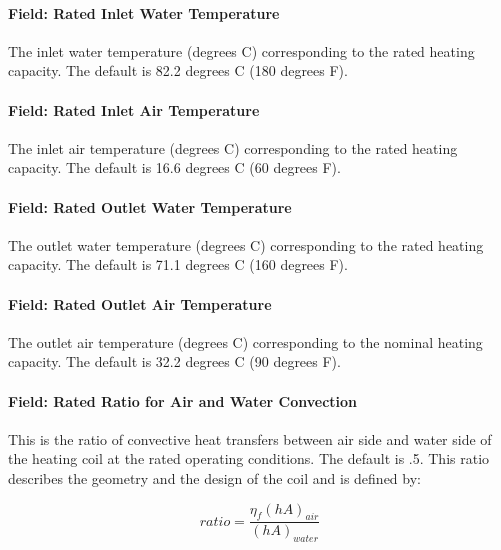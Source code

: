 \paragraph{Field: Rated Inlet Water Temperature}\label{field-rated-inlet-water-temperature}

The inlet water temperature (degrees C) corresponding to the rated heating capacity. The default is 82.2 degrees C (180 degrees F).

\paragraph{Field: Rated Inlet Air Temperature}\label{field-rated-inlet-air-temperature}

The inlet air temperature (degrees C) corresponding to the rated heating capacity. The default is 16.6 degrees C (60 degrees F).

\paragraph{Field: Rated Outlet Water Temperature}\label{field-rated-outlet-water-temperature}

The outlet water temperature (degrees C) corresponding to the rated heating capacity. The default is 71.1 degrees C (160 degrees F).

\paragraph{Field: Rated Outlet Air Temperature}\label{field-rated-outlet-air-temperature}

The outlet air temperature (degrees C) corresponding to the nominal heating capacity. The default is 32.2 degrees C (90 degrees F).

\paragraph{Field: Rated Ratio for Air and Water Convection}\label{field-rated-ratio-for-air-and-water-convection}

This is the ratio of convective heat transfers between air side and water side of the heating coil at the rated operating conditions. The default is .5. This ratio describes the geometry and the design of the coil and is defined by:

\begin{equation}
ratio = \frac{{{\eta_f}{{\left( {hA} \right)}_{air}}}}{{{{\left( {hA} \right)}_{water}}}}
\end{equation}

